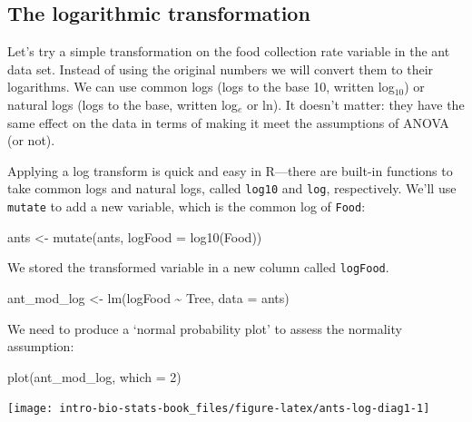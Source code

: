 \documentclass[
]{book}
\newenvironment{Shaded}{\begin{snugshade}}{\end{snugshade}}
\newcommand{\AttributeTok}[1]{\textcolor[rgb]{0.77,0.63,0.00}{#1}}
\newcommand{\DecValTok}[1]{\textcolor[rgb]{0.00,0.00,0.81}{#1}}
\newcommand{\FunctionTok}[1]{\textcolor[rgb]{0.00,0.00,0.00}{#1}}
\newcommand{\NormalTok}[1]{#1}
\newcommand{\OtherTok}[1]{\textcolor[rgb]{0.56,0.35,0.01}{#1}}
\newcommand{\SpecialCharTok}[1]{\textcolor[rgb]{0.00,0.00,0.00}{#1}}
\begin{document}
\hypertarget{the-logarithmic-transformation}{%
\subsection{The logarithmic transformation}\label{the-logarithmic-transformation}}

Let's try a simple transformation on the food collection rate variable in the ant data set. Instead of using the original numbers we will convert them to their logarithms. We can use common logs (logs to the base 10, written log\(_{10}\)) or natural logs (logs to the base, written log\(_{e}\) or ln). It doesn't matter: they have the same effect on the data in terms of making it meet the assumptions of ANOVA (or not).

Applying a log transform is quick and easy in R---there are built-in functions to take common logs and natural logs, called \texttt{log10} and \texttt{log}, respectively. We'll use \texttt{mutate} to add a new variable, which is the common log of \texttt{Food}:

\begin{Shaded}
\begin{Highlighting}[]
\NormalTok{ants }\OtherTok{\textless{}{-}} \FunctionTok{mutate}\NormalTok{(ants, }\AttributeTok{logFood =} \FunctionTok{log10}\NormalTok{(Food))}
\end{Highlighting}
\end{Shaded}

We stored the transformed variable in a new column called \texttt{logFood}.

\begin{Shaded}
\begin{Highlighting}[]
\NormalTok{ant\_mod\_log }\OtherTok{\textless{}{-}} \FunctionTok{lm}\NormalTok{(logFood }\SpecialCharTok{\textasciitilde{}}\NormalTok{ Tree, }\AttributeTok{data =}\NormalTok{ ants)}
\end{Highlighting}
\end{Shaded}

We need to produce a `normal probability plot' to assess the normality assumption:

\begin{Shaded}
\begin{Highlighting}[]
\FunctionTok{plot}\NormalTok{(ant\_mod\_log, }\AttributeTok{which =} \DecValTok{2}\NormalTok{)}
\end{Highlighting}
\end{Shaded}

\begin{center}\texttt{[image: intro-bio-stats-book\_files/figure-latex/ants-log-diag1-1]} \end{center}
\end{document}
